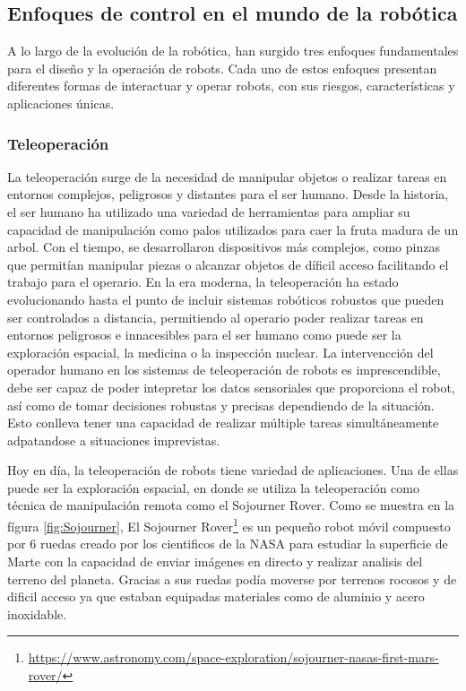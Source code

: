  \subsection{Enfoques de control en el mundo de la robótica}
 \label{sec:enfoquesrobotica}
A lo largo de la evolución de la robótica, han surgido tres enfoques fundamentales para el diseño y la operación de robots. Cada uno de estos enfoques presentan diferentes
formas de interactuar y operar robots, con sus riesgos, características y aplicaciones únicas. 

\subsubsection{Teleoperación}
\label{sec:subseccion}

La teleoperación surge de la necesidad de manipular objetos o realizar tareas en entornos complejos, peligrosos y distantes para el ser humano. Desde la historia, el ser humano
ha utilizado una variedad de herramientas para ampliar su capacidad de manipulación como palos utilizados para caer la fruta madura de un arbol. Con el tiempo, se desarrollaron 
dispositivos más complejos, como pinzas que permitían manipular piezas o alcanzar objetos de díficil acceso facilitando el trabajo para el operario. En la era moderna, la teleoperación
ha estado evolucionando hasta el punto de incluir sistemas robóticos robustos que pueden ser controlados a distancia, permitiendo al operario poder realizar
tareas en entornos peligrosos e innacesibles para el ser humano como puede ser la exploración espacial, la medicina o la inspección nuclear.
La intervencción del operador humano en los sistemas de teleoperación de robots es imprescendible, debe ser capaz de poder intepretar los datos sensoriales que proporciona el robot, así como de 
tomar decisiones robustas y precisas dependiendo de la situación. Esto conlleva tener una capacidad de realizar múltiple tareas simultáneamente adpatandose a situaciones imprevistas. \newline

Hoy en día, la teleoperación de robots tiene variedad de aplicaciones. Una de ellas puede ser la exploración espacial, en donde se utiliza la teleoperación
como técnica de manipulación remota como el Sojourner Rover. Como se muestra en la fígura \ref{fig:Sojourner}, El Sojourner Rover\footnote{\url{https://www.astronomy.com/space-exploration/sojourner-nasas-first-mars-rover/}} 
es un pequeño robot móvil compuesto por 6 ruedas creado por los cientificos de la NASA para estudiar 
la superficie de Marte con la capacidad de enviar imágenes en directo y realizar analisis del terreno del planeta. Gracias a sus ruedas podía moverse por terrenos rocosos y de dificil acceso
ya que estaban equipadas materiales como de aluminio y acero inoxidable. \newline

